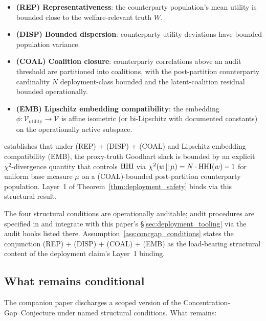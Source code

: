 \begin{itemize}
\item \textbf{(REP) Representativeness}: the counterparty
  population's mean utility is bounded close to the
  welfare-relevant truth $W$.
\item \textbf{(DISP) Bounded dispersion}: counterparty utility
  deviations have bounded population variance.
\item \textbf{(COAL) Coalition closure}: counterparty correlations
  above an audit threshold are partitioned into coalitions, with
  the post-partition counterparty cardinality $N$ deployment-class
  bounded and the latent-coalition residual bounded operationally.
\item \textbf{(EMB) Lipschitz embedding compatibility}: the
  embedding $\phi: \mathcal{V}_\mathrm{utility} \to \mathcal{V}$
  is affine isometric (or bi-Lipschitz with documented
  constants) on the operationally active subspace.
\end{itemize}

\citep[Theorem~2]{lasser2026foundations} establishes that under
(REP) + (DISP) + (COAL) and Lipschitz embedding compatibility
(EMB), the proxy-truth Goodhart slack is bounded by an explicit
$\chi^2$-divergence quantity that controls $\mathrm{HHI}$ via $\chi^2(w
\,\|\, \mu) = N \cdot \mathrm{HHI}(w) - 1$ for uniform base measure $\mu$
on a (COAL)-bounded post-partition counterparty population.
Layer~1 of Theorem~\ref{thm:deployment_safety} binds via this
structural result.

The four structural conditions are operationally auditable;
audit procedures are specified in
\citep[\S 6]{lasser2026foundations} and integrate with this
paper's \S\ref{sec:deployment_tooling} via the audit hooks
listed there.  Assumption~\ref{ass:concgap_conditions} states the
conjunction (REP) + (DISP) + (COAL) + (EMB) as the load-bearing
structural content of the deployment claim's Layer~1 binding.

\subsection{What remains conditional}

The companion paper discharges a scoped version of the
Concentration-Gap~Conjecture under named structural conditions.
What remains:

